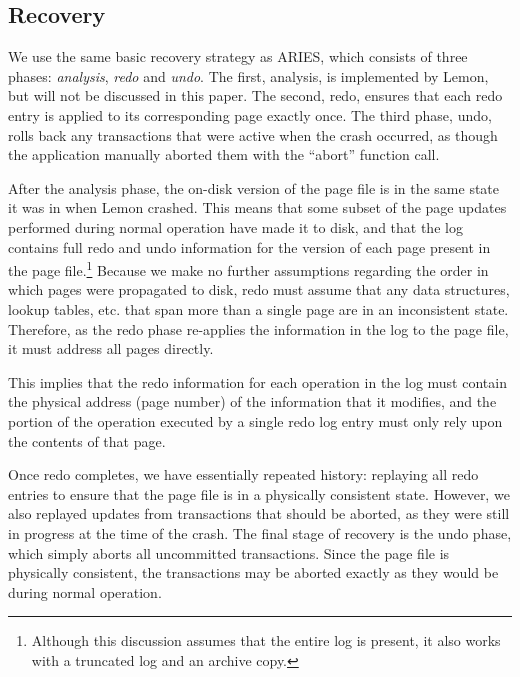 \documentclass[letterpaper,twocolumn,english]{article}
\newcommand{\yad}{Lemon\xspace}
\begin{document}
\subsection{Recovery}
\label{recovery}

%

We use the same basic recovery strategy as ARIES, which consists of
three phases: {\em analysis}, {\em redo} and {\em undo}.  The first,
analysis, is implemented by \yad, but will not be discussed in this
paper. The second, redo, ensures that each redo entry is applied to
its corresponding page exactly once.  The third phase, undo, rolls
back any transactions that were active when the crash occurred, as
though the application manually aborted them with the ``abort''
function call.
  
After the analysis phase, the on-disk version of the page file is in
the same state it was in when \yad crashed. This means that some
subset of the page updates performed during normal operation have made
it to disk, and that the log contains full redo and undo information
for the version of each page present in the page
file.\footnote{Although this discussion assumes that the entire log is
present, it also works with a truncated log and an archive copy.}
Because we make no further assumptions regarding the order in which
pages were propagated to disk, redo must assume that any data
structures, lookup tables, etc. that span more than a single page are
in an inconsistent state. Therefore, as the redo phase re-applies the
information in the log to the page file, it must address all pages
directly.

This implies that the redo information for each operation in the log
must contain the physical address (page number) of the information
that it modifies, and the portion of the operation executed by a
single redo log entry must only rely upon the contents of that
page.

Once redo completes, we have essentially repeated history: replaying
all redo entries to ensure that the page file is in a physically
consistent state.  However, we also replayed updates from transactions
that should be aborted, as they were still in progress at the time of
the crash.  The final stage of recovery is the undo phase, which simply
aborts all uncommitted transactions. Since the page file is physically
consistent, the transactions may be aborted exactly as they would be
during normal operation.
\end{document}
